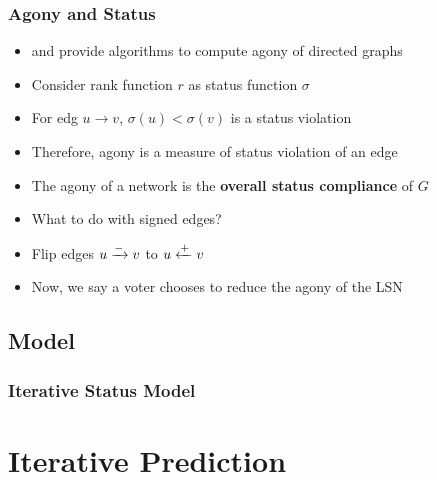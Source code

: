 \documentclass{beamer}
\begin{document}
\begin{frame}
    \frametitle{Agony and Status}
    \begin{itemize}
        \item \cite{gupte2011finding} and \cite{tatti2017tiers} provide algorithms to compute agony of directed graphs
        \item Consider rank function $r$ as status function $\sigma$
        \item For edg $u \rightarrow v$, $\sigma(u)<\sigma(v)$ is a status violation
        \item Therefore, agony is a measure of status violation of an edge
        \item The agony of a network is the \textbf{overall status compliance} of $G$
        \item What to do with signed edges?
        \item Flip edges $u \xrightarrow{-} v$ to $u \xleftarrow{+} v$
        \item Now, we say a voter chooses to reduce the agony of the LSN
    \end{itemize}

\end{frame}

\subsection{Model}
\begin{frame}
    \frametitle{Iterative Status Model}
        \centering
        \scalebox{0.5}{}
    

\end{frame}

\section{Iterative Prediction}
\end{document}
